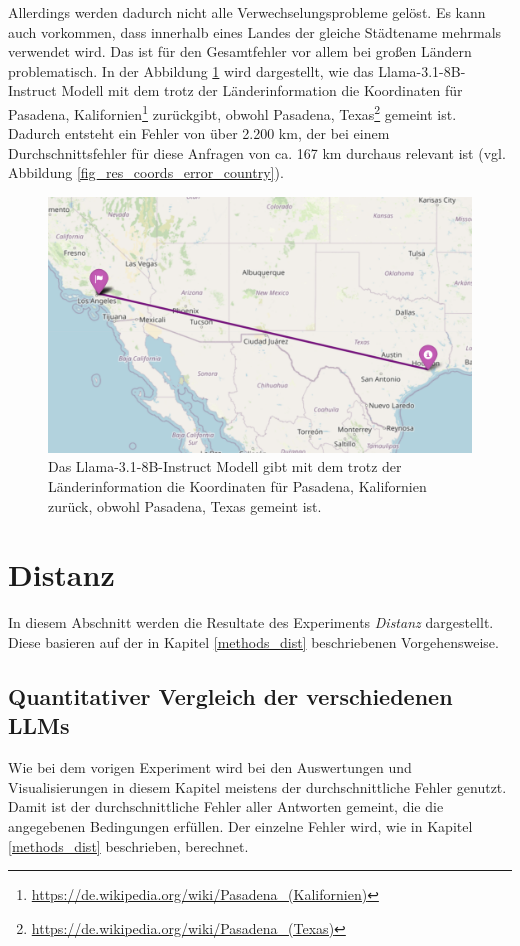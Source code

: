 Allerdings werden dadurch nicht alle Verwechselungsprobleme gelöst.
Es kann auch vorkommen, dass innerhalb eines Landes der gleiche Städtename mehrmals verwendet wird.
Das ist für den Gesamtfehler vor allem bei großen Ländern problematisch.
In der Abbildung \ref{fig_pasadena} wird dargestellt, wie das Llama-3.1-8B-Instruct Modell mit dem \jsonv{} trotz der Länderinformation die Koordinaten für Pasadena, Kalifornien\footnote{\url{https://de.wikipedia.org/wiki/Pasadena_(Kalifornien)}} zurückgibt, obwohl Pasadena, Texas\footnote{\url{https://de.wikipedia.org/wiki/Pasadena_(Texas)}} gemeint ist.
Dadurch entsteht ein Fehler von über 2.200 km, der bei einem Durchschnittsfehler für diese Anfragen von ca. 167 km durchaus relevant ist (vgl. Abbildung \ref{fig_res_coords_error_country}).

\begin{figure}[tb] %
    \centering
    \includegraphics[width=0.7\columnwidth]{img/Karte-Pasadena.png}
    \caption{Das Llama-3.1-8B-Instruct Modell gibt mit dem \jsonv{} trotz der Länderinformation die Koordinaten für Pasadena, Kalifornien zurück, obwohl Pasadena, Texas gemeint ist.}
    \label{fig_pasadena}
\end{figure}

\section{Distanz}
\label{results_dist}
In diesem Abschnitt werden die Resultate des Experiments \textit{Distanz} dargestellt.
Diese basieren auf der in Kapitel \ref{methods_dist} beschriebenen Vorgehensweise.

\subsection{Quantitativer Vergleich der verschiedenen LLMs}
Wie bei dem vorigen Experiment wird bei den Auswertungen und Visualisierungen in diesem Kapitel meistens der durchschnittliche Fehler genutzt.
Damit ist der durchschnittliche Fehler aller Antworten gemeint, die die angegebenen Bedingungen erfüllen.
Der einzelne Fehler wird, wie in Kapitel \ref{methods_dist} beschrieben, berechnet.

